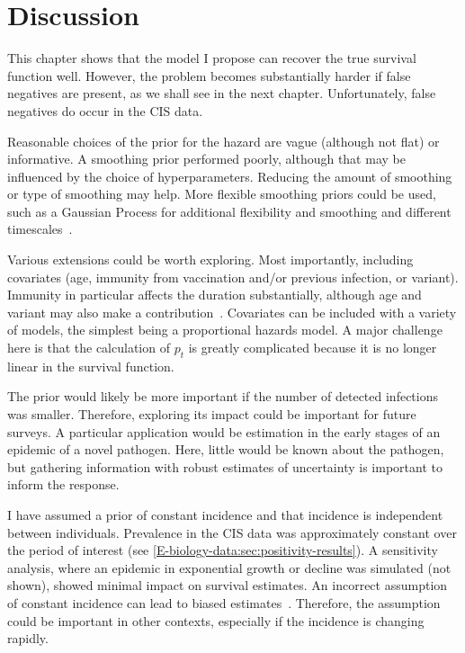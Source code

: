 \documentclass[thesis.tex]{subfiles}
\begin{document}
\section{Discussion} \label{perf-test:sec:discussion}

This chapter shows that the model I propose can recover the true survival function well.
However, the problem becomes substantially harder if false negatives are present, as we shall see in the next chapter.
Unfortunately, false negatives do occur in the CIS data.

Reasonable choices of the prior for the hazard are vague (although not flat) or informative.
A smoothing prior performed poorly, although that may be influenced by the choice of hyperparameters.
Reducing the amount of smoothing or type of smoothing may help.
More flexible smoothing priors could be used, such as a Gaussian Process for additional flexibility and smoothing and different timescales~\autocite{saulGaussian}.

Various extensions could be worth exploring.
Most importantly, including covariates (\eg age, immunity from vaccination and/or previous infection, or variant).
Immunity in particular affects the duration substantially, although age and variant may also make a contribution~\autocite{hakkiOnset,russellWithinhost}.
Covariates can be included with a variety of models, the simplest being a proportional hazards model.
A major challenge here is that the calculation of $p_t$ is greatly complicated because it is no longer linear in the survival function.

The prior would likely be more important if the number of detected infections was smaller.
Therefore, exploring its impact could be important for future surveys.
A particular application would be estimation in the early stages of an epidemic of a novel pathogen.
Here, little would be known about the pathogen, but gathering information with robust estimates of uncertainty is important to inform the response.

I have assumed a prior of constant incidence and that incidence is independent between individuals.
Prevalence in the CIS data was approximately constant over the period of interest (see \cref{E-biology-data:sec:positivity-results}).
A sensitivity analysis, where an epidemic in exponential growth or decline was simulated (not shown), showed minimal impact on survival estimates.
An incorrect assumption of constant incidence can lead to biased estimates~\autocite{degruttolaAnalysis}.
Therefore, the assumption could be important in other contexts, especially if the incidence is changing rapidly.
\end{document}
